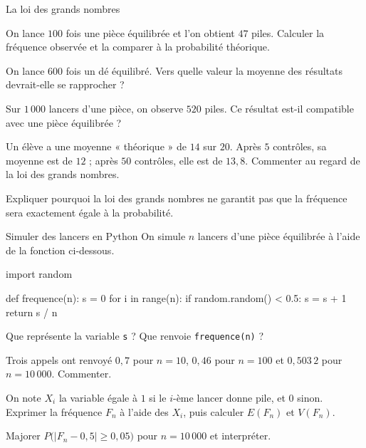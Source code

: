 \begin{exercice}[1]{La loi des grands nombres}
\begin{questions}
  \item On lance $100$ fois une pièce équilibrée et l'on obtient $47$ piles. Calculer la fréquence observée et la comparer à la
    probabilité théorique.
  \item On lance $600$ fois un dé équilibré. Vers quelle valeur la moyenne des résultats devrait-elle se rapprocher ?
  \item Sur $1\,000$ lancers d'une pièce, on observe $520$ piles. Ce résultat est-il compatible avec une pièce équilibrée ?
  \item Un élève a une moyenne « théorique » de $14$ sur $20$. Après $5$ contrôles, sa moyenne est de $12$ ; après $50$ contrôles, elle
    est de $13{,}8$. Commenter au regard de la loi des grands nombres.
  \item Expliquer pourquoi la loi des grands nombres ne garantit pas que la fréquence sera exactement égale à la probabilité.
\end{questions}
\end{exercice}

\begin{exercice}[1]{Simuler des lancers en Python}
On simule $n$ lancers d'une pièce équilibrée à l'aide de la fonction ci-dessous.
\begin{python}
import random

def frequence(n):
    s = 0
    for i in range(n):
        if random.random() < 0.5:
            s = s + 1
    return s / n
\end{python}
\begin{questions}
  \item Que représente la variable \texttt{s} ? Que renvoie \texttt{frequence(n)} ?
  \item Trois appels ont renvoyé $0{,}7$ pour $n=10$, $0{,}46$ pour $n=100$ et $0{,}503\,2$ pour $n=10\,000$. Commenter.
  \item On note $X_i$ la variable égale à $1$ si le $i$-ème lancer donne pile, et $0$ sinon. Exprimer la fréquence $F_n$ à l'aide des
    $X_i$, puis calculer $E(F_n)$ et $V(F_n)$.
  \item Majorer $P\big(|F_n-0{,}5|\geq0{,}05\big)$ pour $n=10\,000$ et interpréter.
\end{questions}
\end{exercice}


